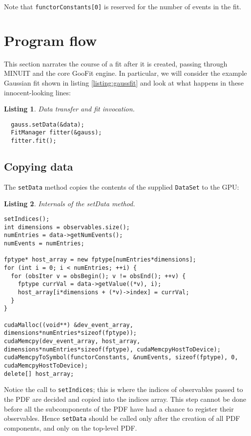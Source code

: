 \documentclass[12pt,pdflatex]{article}
\newtheorem{listing}{Listing}
\begin{document}
Note that \verb|functorConstants[0]| is reserved for the number of events
in the fit. 

\section{Program flow} 
\label{sec:engine}

This section narrates the course of a fit after it is created, passing through
MINUIT and the core GooFit engine. In particular, we will consider the example
Gaussian fit shown in listing \ref{listing:gaussfit} and look at what happens
in these innocent-looking lines:
\begin{listing}
\label{listing:actualfit}
Data transfer and fit invocation.

\begin{verbatim}
  gauss.setData(&data);
  FitManager fitter(&gauss); 
  fitter.fit(); 
\end{verbatim}
\end{listing} 

\subsection{Copying data} 

The \texttt{setData} method copies the contents of the supplied \texttt{DataSet}
to the GPU:
\begin{listing}
\label{listing:setData}
Internals of the setData method.

\begin{verbatim}
setIndices();
int dimensions = observables.size();
numEntries = data->getNumEvents(); 
numEvents = numEntries; 

fptype* host_array = new fptype[numEntries*dimensions];
for (int i = 0; i < numEntries; ++i) {
  for (obsIter v = obsBegin(); v != obsEnd(); ++v) {
    fptype currVal = data->getValue((*v), i);
    host_array[i*dimensions + (*v)->index] = currVal; 
  }
}

cudaMalloc((void**) &dev_event_array, dimensions*numEntries*sizeof(fptype)); 
cudaMemcpy(dev_event_array, host_array, dimensions*numEntries*sizeof(fptype), cudaMemcpyHostToDevice);
cudaMemcpyToSymbol(functorConstants, &numEvents, sizeof(fptype), 0, cudaMemcpyHostToDevice); 
delete[] host_array; 
\end{verbatim}
\end{listing} 
Notice the call to \texttt{setIndices}; this is where the indices
of observables passed to the PDF are decided and copied into the indices
array. This step cannot be done before all the subcomponents of the 
PDF have had a chance to register their observables. Hence \texttt{setData}
should be called only after the creation of all PDF components, and only
on the top-level PDF. 
\end{document}
